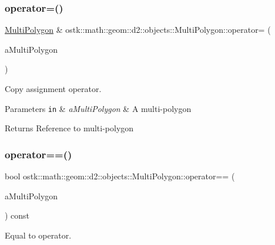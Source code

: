 \subsubsection{\texorpdfstring{operator=()}{operator=()}}
{\footnotesize\ttfamily \hyperlink{classostk_1_1math_1_1geom_1_1d2_1_1objects_1_1_multi_polygon}{Multi\+Polygon} \& ostk\+::math\+::geom\+::d2\+::objects\+::\+Multi\+Polygon\+::operator= (\begin{DoxyParamCaption}\item[{const \hyperlink{classostk_1_1math_1_1geom_1_1d2_1_1objects_1_1_multi_polygon}{Multi\+Polygon} \&}]{a\+Multi\+Polygon }\end{DoxyParamCaption})}



Copy assignment operator. 


\begin{DoxyParams}[1]{Parameters}
\mbox{\tt in}  & {\em a\+Multi\+Polygon} & A multi-\/polygon \\
\hline
\end{DoxyParams}
\begin{DoxyReturn}{Returns}
Reference to multi-\/polygon 
\end{DoxyReturn}
\mbox{\label{classostk_1_1math_1_1geom_1_1d2_1_1objects_1_1_multi_polygon_a8f3d731143998dacaaea1f0dffa9fa2c}} 
\subsubsection{\texorpdfstring{operator==()}{operator==()}}
{\footnotesize\ttfamily bool ostk\+::math\+::geom\+::d2\+::objects\+::\+Multi\+Polygon\+::operator== (\begin{DoxyParamCaption}\item[{const \hyperlink{classostk_1_1math_1_1geom_1_1d2_1_1objects_1_1_multi_polygon}{Multi\+Polygon} \&}]{a\+Multi\+Polygon }\end{DoxyParamCaption}) const}



Equal to operator. 


